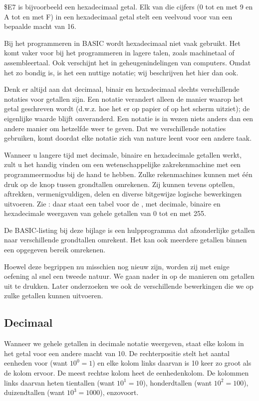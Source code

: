 \$E7 is bijvoorbeeld een hexadecimaal getal. Elk van die cijfers (0 tot en met 9 en A tot en met F) in een hexadecimaal getal stelt een veelvoud voor van een bepaalde macht van 16.

Bij het programmeren in BASIC wordt hexadecimaal niet vaak gebruikt. Het komt vaker voor bij het programmeren in lagere talen, zoals machinetaal of assembleertaal. Ook verschijnt het in geheugenindelingen van computers. Omdat het zo bondig is, is het een nuttige notatie; wij beschrijven het hier dan ook.

Denk er altijd aan dat decimaal, binair en hexadecimaal slechts verschillende notaties voor getallen zijn. Een notatie verandert alleen de manier waarop het getal geschreven wordt (d.w.z. hoe het er op papier of op het scherm uitziet); de eigenlijke waarde blijft onveranderd. Een notatie is in wezen niets anders dan een andere manier om hetzelfde weer te geven. Dat we verschillende notaties gebruiken, komt doordat elke notatie zich van nature leent voor een andere taak.

Wanneer u langere tijd met decimale, binaire en hexadecimale getallen werkt, zult u het handig vinden om een wetenschappelijke zakrekenmachine met een programmeermodus bij de hand te hebben. Zulke rekenmachines kunnen met één druk op de knop tussen grondtallen omrekenen. Zij kunnen tevens optellen, aftrekken, vermenigvuldigen, delen en diverse bitgewijze logische bewerkingen uitvoeren. Zie : daar staat een tabel voor de , met decimale, binaire en hexadecimale weergaven van gehele getallen van 0 tot en met 255.

De BASIC-listing bij deze bijlage is een hulpprogramma dat afzonderlijke getallen naar verschillende grondtallen omrekent. Het kan ook meerdere getallen binnen een opgegeven bereik omrekenen.

Hoewel deze begrippen nu misschien nog nieuw zijn, worden zij met enige oefening al snel een tweede natuur. We gaan nader in op de manieren om getallen uit te drukken. Later onderzoeken we ook de verschillende bewerkingen die we op zulke getallen kunnen uitvoeren.

\subsection{Decimaal}Wanneer we gehele getallen in decimale notatie weergeven, staat elke kolom in het getal voor een andere macht van 10. De rechterpositie stelt het aantal eenheden voor (want $10^{0} = 1$) en elke kolom links daarvan is 10 keer zo groot als de kolom ervoor. De meest rechtse kolom heet de eenhedenkolom. De kolommen links daarvan heten tientallen (want $10^{1} = 10$), honderdtallen (want $10^{2} = 100$), duizendtallen (want $10^{3} = 1000$), enzovoort.

